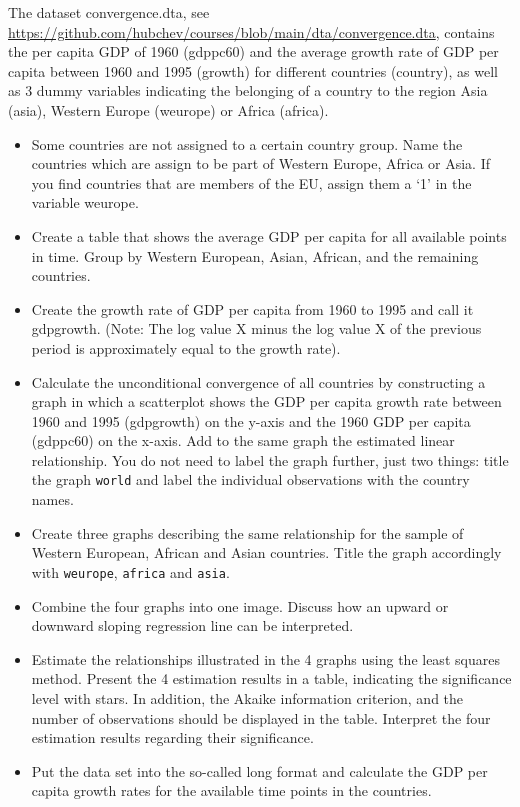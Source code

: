 \documentclass[
  12pt,
  oneside]{book}
\providecommand{\tightlist}{%
  \setlength{\itemsep}{0pt}\setlength{\parskip}{0pt}}
\begin{document}
The dataset convergence.dta, see \url{https://github.com/hubchev/courses/blob/main/dta/convergence.dta}, contains the per capita GDP of 1960 (gdppc60) and the average growth rate of GDP per capita between 1960 and 1995 (growth) for different countries (country), as well as 3 dummy variables indicating the belonging of a country to the region Asia (asia), Western Europe (weurope) or Africa (africa).

\begin{itemize}
\tightlist
\item
  Some countries are not assigned to a certain country group. Name the countries which are assign to be part of Western Europe, Africa or Asia. If you find countries that are members of the EU, assign them a `1' in the variable weurope.
\item
  Create a table that shows the average GDP per capita for all available points in time. Group by Western European, Asian, African, and the remaining countries.
\item
  Create the growth rate of GDP per capita from 1960 to 1995 and call it gdpgrowth. (Note: The log value X minus the log value X of the previous period is approximately equal to the growth rate).
\item
  Calculate the unconditional convergence of all countries by constructing a graph in which a scatterplot shows the GDP per capita growth rate between 1960 and 1995 (gdpgrowth) on the y-axis and the 1960 GDP per capita (gdppc60) on the x-axis. Add to the same graph the estimated linear relationship. You do not need to label the graph further, just two things: title the graph \texttt{world} and label the individual observations with the country names.
\item
  Create three graphs describing the same relationship for the sample of Western European, African and Asian countries. Title the graph accordingly with \texttt{weurope}, \texttt{africa} and \texttt{asia}.
\item
  Combine the four graphs into one image. Discuss how an upward or downward sloping regression line can be interpreted.
\item
  Estimate the relationships illustrated in the 4 graphs using the least squares method. Present the 4 estimation results in a table, indicating the significance level with stars. In addition, the Akaike information criterion, and the number of observations should be displayed in the table. Interpret the four estimation results regarding their significance.
\item
  Put the data set into the so-called long format and calculate the GDP per capita growth rates for the available time points in the countries.
\end{itemize}
\end{document}
